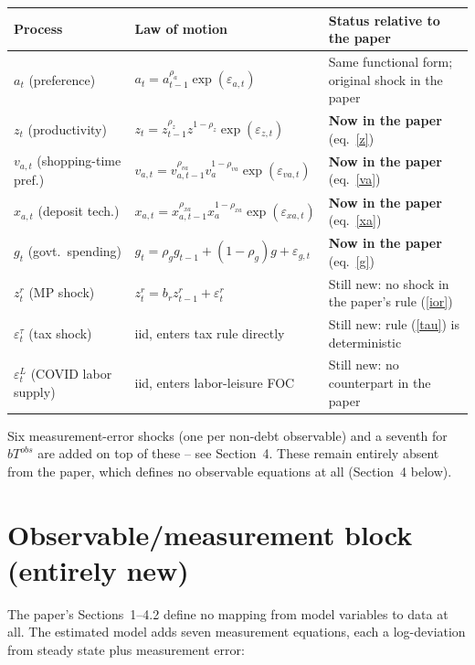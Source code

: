 \documentclass[11pt]{article}
\begin{document}
\begin{center}
\begin{tabular}{@{}lll@{}}
\toprule
Process & Law of motion & Status relative to the paper \\
\midrule
$a_t$ (preference)     & $a_t=a_{t-1}^{\rho_a}\exp(\varepsilon_{a,t})$ & Same functional form; original shock in the paper \\
$z_t$ (productivity)   & $z_t=z_{t-1}^{\rho_z}z^{1-\rho_z}\exp(\varepsilon_{z,t})$ & \textbf{Now in the paper} (eq.~\ref{z}) \\
$v_{a,t}$ (shopping-time pref.) & $v_{a,t}=v_{a,t-1}^{\rho_{va}}v_a^{1-\rho_{va}}\exp(\varepsilon_{va,t})$ & \textbf{Now in the paper} (eq.~\ref{va}) \\
$x_{a,t}$ (deposit tech.) & $x_{a,t}=x_{a,t-1}^{\rho_{xa}}x_a^{1-\rho_{xa}}\exp(\varepsilon_{xa,t})$ & \textbf{Now in the paper} (eq.~\ref{xa}) \\
$g_t$ (govt.\ spending) & $g_t=\rho_g g_{t-1}+(1-\rho_g)g+\varepsilon_{g,t}$ & \textbf{Now in the paper} (eq.~\ref{g}) \\
$z^r_t$ (MP shock)      & $z^r_t=b_r z^r_{t-1}+\varepsilon^r_t$ & Still new: no shock in the paper's rule (\ref{ior}) \\
$\varepsilon^\tau_t$ (tax shock) & iid, enters tax rule directly & Still new: rule (\ref{tau}) is deterministic \\
$\varepsilon^L_t$ (COVID labor supply) & iid, enters labor-leisure FOC & Still new: no counterpart in the paper \\
\bottomrule
\end{tabular}
\end{center}

Six measurement-error shocks (one per non-debt observable) and a
seventh for $bT^{obs}$ are added on top of these -- see Section~4. These
remain entirely absent from the paper, which defines no observable
equations at all (Section~4 below).

\section{Observable/measurement block (entirely new)}

The paper's Sections~1--4.2 define no mapping from model variables to
data at all. The estimated model adds seven measurement equations, each
a log-deviation from steady state plus measurement error:
\end{document}
